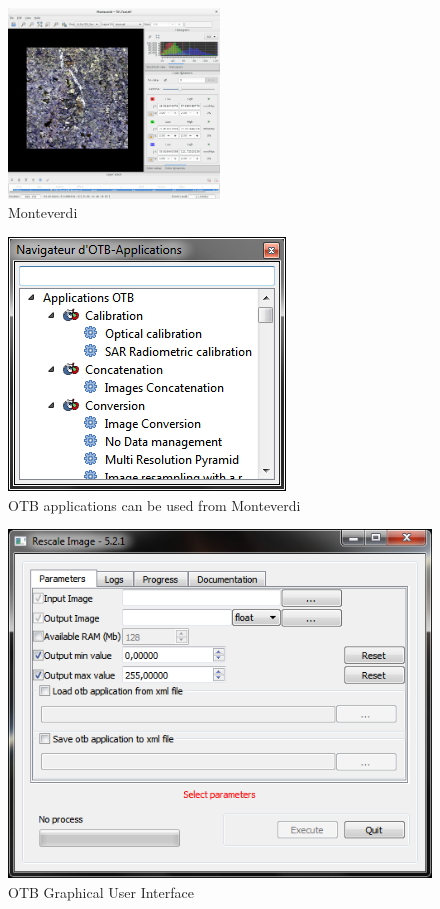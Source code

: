 \documentclass[10pt,a4paper]{article}
\begin{document}
\begin{figure}[!htbp]
  \center
  \includegraphics[width=0.5\textwidth]{Art/monteverdi-tif.png}
  \caption[]{Monteverdi}
  \label{fig:monteverdi}
\end{figure}

\begin{figure}[!htbp]
  \center
  \includegraphics[scale=0.5]{Art/windows-mapla.png}
  \caption[]{OTB applications can be used from Monteverdi}
  \label{fig:windows-mapla}
\end{figure}

\begin{figure}[!htbp]
  \center
  \includegraphics[scale=0.5]{Art/windows-otbgui.png}
  \caption[]{OTB Graphical User Interface}
  \label{fig:windows-otbgui}
\end{figure}
\end{document}
